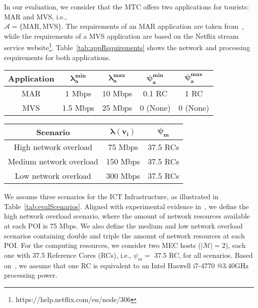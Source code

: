 In our evaluation, we consider that the MTC offers two applications for tourists: {MAR} and {MVS}, i.e., \\ $\mathcal{A}=\{\textrm{{MAR}}, \textrm{{MVS}}\}$. The requirements of an {MAR} application are taken from~\cite{garcia:18}, while the requirements of a {MVS} application are based on the Netflix stream service website\footnote{https://help.netflix.com/en/node/306}. Table~\ref{tab:appRequirements} shows the network and processing requirements for both applications.

\begin{table*}[!ht]
    \begin{minipage}[!ht]{.45\textwidth}
    \centering
    \footnotesize
    \label{tab:appRequirements}
    \begin{tabular}{ccccc}
    \hline
    \textbf{Application} & $\boldsymbol{\lambda^{min}_{a}}$ & $\boldsymbol{\lambda^{max}_{a}}$ & $\boldsymbol{\psi^{min}_{a}}$ & $\boldsymbol{\psi^{max}_{a}}$ \\ \hline
    {MAR}             & 1 Mbps     &  10 Mbps & 0.1 RC   & 1 RC \\
    {MVS}               & 1.5 Mbps   &  25 Mbps & 0 (None) & 0 (None) \\
    \hline
    \end{tabular}
    \end{minipage}
\hspace{0.05\textwidth}
    \begin{minipage}[!ht]{.45\textwidth}
    \centering
    \footnotesize
    \label{tab:evalScenarios}
    \begin{tabular}{ccc}
    \hline
    \textbf{Scenario} & $\boldsymbol{\lambda({v_{i}})}$ & $\boldsymbol{{\psi}_{m}}$ \\ \hline
    High network overload     & 75 Mbps   &  37.5 RCs \\
    Medium network overload   & 150 Mbps  &  37.5 RCs \\
    Low network overload      & 300 Mbps  &  37.5 RCs \\
    \hline
    \end{tabular}
    \end{minipage}
\end{table*}

We assume three scenarios for the ICT Infrastructure, as illustrated in Table~\ref{tab:evalScenarios}. Aligned with experimental evidence in~\cite{malandrino:18}, we define the high network overload scenario, where the amount of network resources available at each POI is 75 Mbps. We also define the medium and low network overload scenarios containing double and triple the amount of network resources at each POI. For the computing resources, we consider two MEC hosts ($|\mathcal{M}|= 2$), each one with 37.5 Reference Cores (RCs), i.e., ${\psi}_{m}=$ 37.5 RC, for all scenarios. Based on~\cite{garcia:18}, we assume that one RC is equivalent to an Intel Haswell i7-4770 @3.40GHz processing power.

